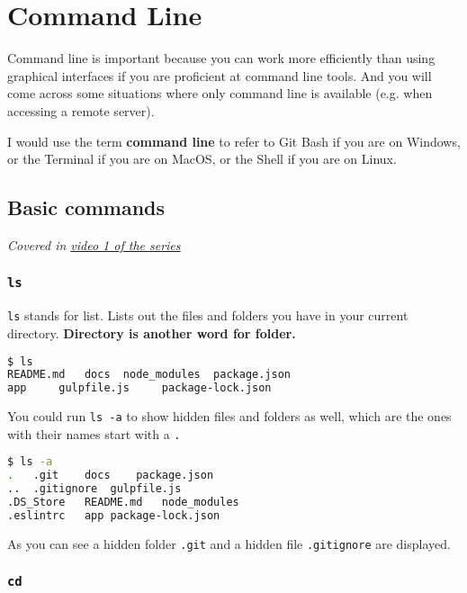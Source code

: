 \chapter{Command Line}
\label{sec:cmd}

Command line is important because you can work more efficiently than using graphical interfaces if you are proficient at command line tools. And you will come across some situations where only command line is available (e.g. when accessing a remote server).

I would use the term \textbf{command line} to refer to Git Bash if you are on Windows, or the Terminal if you are on MacOS, or the Shell if you are on Linux. 

\section{Basic commands}

\textit{Covered in \href{https://www.youtube.com/watch?v=oIsH0V3fRt8&list=PLjGmdnqrOKuYXiu7lgG5HW71jPEUd1XCm&index=2}{video 1 of the series}}

\subsection{\texttt{ls}}

\texttt{ls} stands for list. Lists out the files and folders you have in your current directory. \textbf{Directory is another word for folder.}
\vspace{6mm}

\begin{lstlisting}[language=bash]
$ ls
README.md   docs  node_modules  package.json    
app     gulpfile.js     package-lock.json
\end{lstlisting}

You could run \texttt{ls -a} to show hidden files and folders as well, which are the ones with their names start with a \texttt{.}

\begin{lstlisting}[language=bash]
$ ls -a
.   .git    docs    package.json
..  .gitignore  gulpfile.js
.DS_Store   README.md   node_modules
.eslintrc   app package-lock.json
\end{lstlisting}

As you can see a hidden folder \texttt{.git} and a hidden file \texttt{.gitignore} are displayed.

\subsection{\texttt{cd}}

